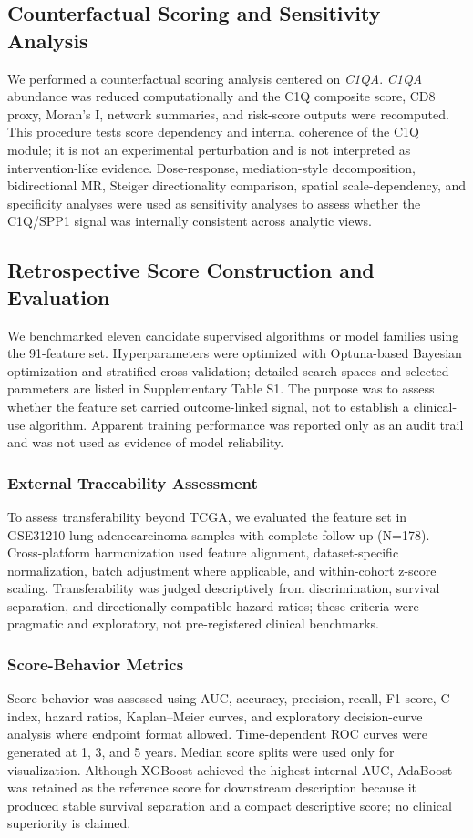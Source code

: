 \documentclass[pdflatex,sn-mathphys-num,referee,lineno]{sn-jnl}
\theoremstyle{thmstyleone}%
\theoremstyle{thmstyletwo}%
\theoremstyle{thmstylethree}%
\begin{document}
\subsection{Counterfactual Scoring and Sensitivity Analysis}\label{subsec:virtual_ko}
We performed a counterfactual scoring analysis centered on \textit{C1QA}. \textit{C1QA} abundance was reduced computationally and the C1Q composite score, CD8 proxy, Moran's I, network summaries, and risk-score outputs were recomputed. This procedure tests score dependency and internal coherence of the C1Q module; it is not an experimental perturbation and is not interpreted as intervention-like evidence. Dose-response, mediation-style decomposition, bidirectional MR, Steiger directionality comparison, spatial scale-dependency, and specificity analyses were used as sensitivity analyses to assess whether the C1Q/SPP1 signal was internally consistent across analytic views.

\subsection{Retrospective Score Construction and Evaluation}\label{subsec:ml_methods}

We benchmarked eleven candidate supervised algorithms or model families using the 91-feature set. Hyperparameters were optimized with Optuna-based Bayesian optimization and stratified cross-validation; detailed search spaces and selected parameters are listed in Supplementary Table S1. The purpose was to assess whether the feature set carried outcome-linked signal, not to establish a clinical-use algorithm. Apparent training performance was reported only as an audit trail and was not used as evidence of model reliability.

\subsubsection{External Traceability Assessment}
To assess transferability beyond TCGA, we evaluated the feature set in GSE31210 lung adenocarcinoma samples with complete follow-up (N=178). Cross-platform harmonization used feature alignment, dataset-specific normalization, batch adjustment where applicable, and within-cohort z-score scaling. Transferability was judged descriptively from discrimination, survival separation, and directionally compatible hazard ratios; these criteria were pragmatic and exploratory, not pre-registered clinical benchmarks.

\subsubsection{Score-Behavior Metrics}
Score behavior was assessed using AUC, accuracy, precision, recall, F1-score, C-index, hazard ratios, Kaplan--Meier curves, and exploratory decision-curve analysis where endpoint format allowed. Time-dependent ROC curves were generated at 1, 3, and 5 years. Median score splits were used only for visualization. Although XGBoost achieved the highest internal AUC, AdaBoost was retained as the reference score for downstream description because it produced stable survival separation and a compact descriptive score; no clinical superiority is claimed.
\end{document}
